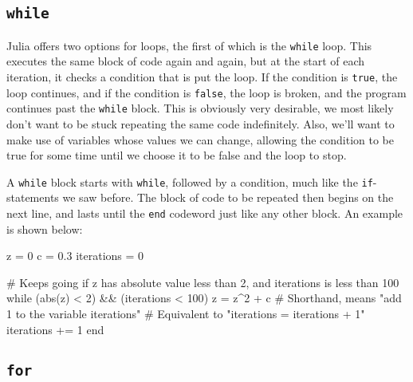 \documentclass[
  letterpaper,
  DIV=11,
  numbers=noendperiod]{scrreprt}
\newenvironment{Shaded}{\begin{snugshade}}{\end{snugshade}}
\newcommand{\CommentTok}[1]{\textcolor[rgb]{0.37,0.37,0.37}{#1}}
\newcommand{\ControlFlowTok}[1]{\textcolor[rgb]{0.00,0.23,0.31}{#1}}
\newcommand{\FloatTok}[1]{\textcolor[rgb]{0.68,0.00,0.00}{#1}}
\newcommand{\FunctionTok}[1]{\textcolor[rgb]{0.28,0.35,0.67}{#1}}
\newcommand{\NormalTok}[1]{\textcolor[rgb]{0.00,0.23,0.31}{#1}}
\newcommand{\OperatorTok}[1]{\textcolor[rgb]{0.37,0.37,0.37}{#1}}
\begin{document}
\hypertarget{while}{%
\subsection{\texorpdfstring{\texttt{while}}{while}}\label{while}}

Julia offers two options for loops, the first of which is the
\texttt{while} loop. This executes the same block of code again and
again, but at the start of each iteration, it checks a condition that is
put the loop. If the condition is \texttt{true}, the loop continues, and
if the condition is \texttt{false}, the loop is broken, and the program
continues past the \texttt{while} block. This is obviously very
desirable, we most likely don't want to be stuck repeating the same code
indefinitely. Also, we'll want to make use of variables whose values we
can change, allowing the condition to be true for some time until we
choose it to be false and the loop to stop.

A \texttt{while} block starts with \texttt{while}, followed by a
condition, much like the \texttt{if}-statements we saw before. The block
of code to be repeated then begins on the next line, and lasts until the
\texttt{end} codeword just like any other block. An example is shown
below:

\begin{Shaded}
\begin{Highlighting}[]
\NormalTok{z }\OperatorTok{=} \FloatTok{0}
\NormalTok{c }\OperatorTok{=} \FloatTok{0.3}
\NormalTok{iterations }\OperatorTok{=} \FloatTok{0}

\CommentTok{\# Keeps going if z has absolute value less than 2, and iterations is less than 100}
\ControlFlowTok{while}\NormalTok{ (}\FunctionTok{abs}\NormalTok{(z) }\OperatorTok{\textless{}} \FloatTok{2}\NormalTok{) }\OperatorTok{\&\&}\NormalTok{ (iterations }\OperatorTok{\textless{}} \FloatTok{100}\NormalTok{)}
\NormalTok{    z }\OperatorTok{=}\NormalTok{ z}\OperatorTok{\^{}}\FloatTok{2} \OperatorTok{+}\NormalTok{ c}
    \CommentTok{\# Shorthand, means "add 1 to the variable iterations"}
    \CommentTok{\# Equivalent to "iterations = iterations + 1"}
\NormalTok{    iterations }\OperatorTok{+=} \FloatTok{1}
\ControlFlowTok{end}
\end{Highlighting}
\end{Shaded}

\hypertarget{for}{%
\subsection{\texorpdfstring{\texttt{for}}{for}}\label{for}}
\end{document}
